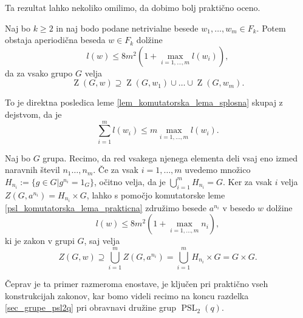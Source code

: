 Ta rezultat lahko nekoliko omilimo, da dobimo bolj praktično oceno.
\begin{posledica}
\label{psl_komutatorska_lema_prakticna}
Naj bo $k \ge 2$ in naj bodo podane netrivialne besede $w_1, \ldots, w_m \in  F_k$. Potem obstaja aperiodična beseda $w \in  F_k$ dolžine \begin{equation*}
l(w) \le 8m^2 \left(1 +  \max_{i = 1, \ldots, m} l(w_i) \right),
\end{equation*}      
da za vsako grupo $G$ velja \begin{equation*}
    \operatorname{Z}(G, w) \supseteq \operatorname{Z}(G, w_1) \cup \ldots \cup  \operatorname{Z}(G, w_{m}).
    \end{equation*}  
\end{posledica}
\begin{dokaz}
    To je direktna posledica leme \ref{lem_komutatorska_lema_splosna} skupaj z dejstvom, da je \begin{equation*}
    \sum_{i = 1}^{m} l(w_{i}) \le m \max_{i = 1, \ldots, m} l(w_i).
    \end{equation*}  
\end{dokaz}



\begin{primer}\label{prm_komutatorska_redi_elementov}
Naj bo $G$ grupa. Recimo, da red vsakega njenega elementa deli vsaj eno izmed naravnih števil $n_1 \ldots, n_m$. Če za vsak $i = 1, \ldots , m$ uvedemo množico $H_{n_i} := \{ g \in G \vert g^{n_i} = 1_G \}$,
očitno velja, da je $\bigcup_{i = 1}^m H_{n_i} = G$. Ker za vsak $i$ velja $Z(G, a^{n_i}) = H_{n_i} \times G$, lahko s pomočjo komutatorske leme \ref{psl_komutatorska_lema_prakticna} združimo besede $a^{n_i}$ v besedo $w$ dolžine
\begin{equation*}
    l(w) \le 8 m^2 \left( 1 + \max_{i = 1, \ldots, m} n_i \right),
\end{equation*}
ki je zakon v grupi $G$, saj velja \begin{equation*}
    Z(G, w) \supseteq \bigcup_{i = 1}^m Z(G, a^{n_i}) =  \bigcup_{i = 1}^m H_{n_i} \times G = G \times G.
\end{equation*}\end{primer}
Čeprav je ta primer razmeroma enostave, je ključen pri praktično vseh konstrukcijah zakonov, kar bomo videli recimo na koncu razdelka \ref{sec_grupe_psl2q} pri obravnavi družine grup $\operatorname{PSL}_2(q)$. 

